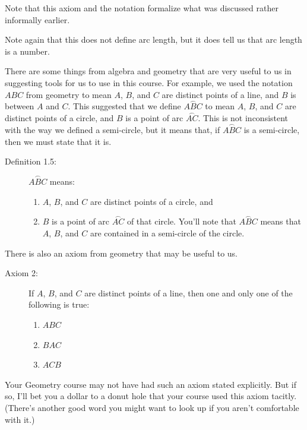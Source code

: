 \documentclass[english]{book}
\newcommand{\arc}[1]{\overset{\frown}{#1} }
\begin{document}
Note that this axiom and the notation formalize what was discussed rather informally earlier.

Note again that this does not define arc length, but it does tell us that arc length is a number.

\vspace{0.3cm}

There are some things from algebra and geometry that are very useful to us in suggesting tools for us to use in this course. For example, we used the notation $ABC$ from geometry to mean $A$, $B$, and $C$ are distinct points of a line, and $B$ is between $A$ and $C$. This suggested that we define $\arc{ABC}$ to mean $A$, $B$, and $C$ are distinct points of a circle, and $B$ is a point of arc $\arc{AC}$. This is not inconsistent with the way we defined a semi-circle, but it means that, if $\arc{ABC}$ is a semi-circle, then we must state that it is.

\begin{description}
\item[Definition 1.5:] $\arc{ABC}$ means:
  \begin{enumerate}[\hspace{1cm}1)]
    \item $A$, $B$, and $C$ are distinct points of a circle, and
    \item $B$ is a point of arc $\arc{AC}$ of that circle. You'll note that $\arc{ABC}$ means that $A$, $B$, and $C$ are contained in a semi-circle of the circle.
  \end{enumerate}
\end{description}

There is also an axiom from geometry that may be useful to us.

\begin{description}
\item[Axiom 2:] If $A$, $B$, and $C$ are distinct points of a line, then one and only one of the following is true:
  \begin{enumerate}[\hspace{1cm}1)]
    \item $ABC$ 
    \item $BAC$
    \item $ACB$
  \end{enumerate}
\end{description}

Your Geometry course may not have had such an axiom stated explicitly. But if so, I'll bet you a dollar to a donut hole that your course used this axiom tacitly. (There's another good word you might want to look up if you aren't comfortable with it.)
\end{document}
